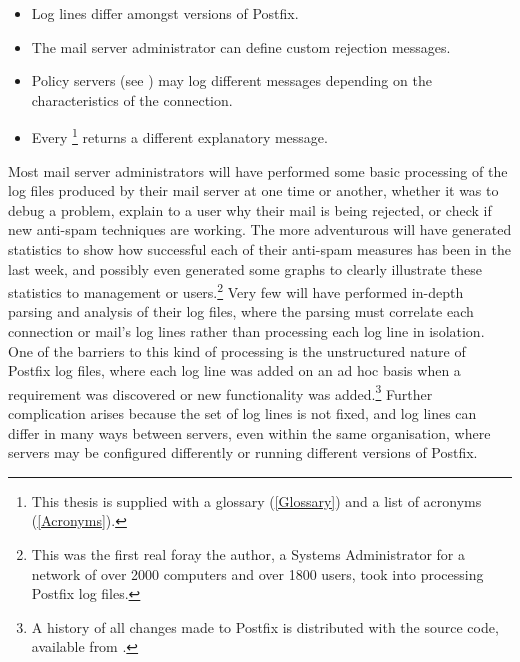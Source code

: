 \begin{itemize}

    \squeezeitems{}

    \item Log lines differ amongst versions of Postfix.

    \item The mail server administrator can define custom rejection
        messages.

    \item Policy servers (see ) may log
        different messages depending on the characteristics of the
        connection.

    \item Every \footnote{This thesis is supplied with a
        glossary (\textsection\ref{Glossary}) and a list of acronyms
        (\textsection\ref{Acronyms}).} returns a different explanatory
        message.

\end{itemize}

Most mail server administrators will have performed some basic processing
of the log files produced by their mail server at one time or another,
whether it was to debug a problem, explain to a user why their mail is
being rejected, or check if new anti-spam techniques are working.  The more
adventurous will have generated statistics to show how successful each of
their anti-spam measures has been in the last week, and possibly even
generated some graphs to clearly illustrate these statistics to management
or users.\footnote{This was the first real foray the author, a Systems
Administrator for a network of over 2000 computers and over 1800 users,
took into processing Postfix log files.}  Very few will have performed
in-depth parsing and analysis of their log files, where the parsing must
correlate each connection or mail's log lines rather than
processing each log line in isolation.  One of the barriers to this kind of
processing is the unstructured nature of Postfix log files, where each log
line was added on an ad hoc basis when a requirement was discovered or new
functionality was added.\footnote{A history of all changes made to Postfix
is distributed with the source code, available from
.}  Further
complication arises because the set of log lines is not fixed, and log
lines can differ in many ways between servers, even within the same
organisation, where servers may be configured differently or running
different versions of Postfix.

